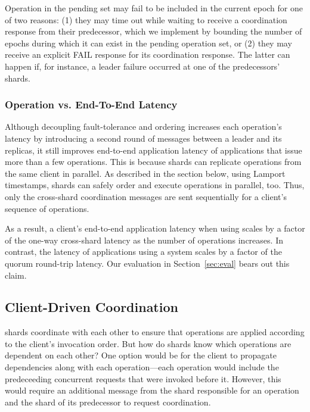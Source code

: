 Operation in the pending set may fail to be included in the current epoch for
one of two reasons: (1) they may time out while waiting to receive a
coordination response from their predecessor, which we implement by bounding the
number of epochs during which it can exist in the pending operation set, or (2)
they may receive an explicit FAIL response for its coordination response. The
latter can happen if, for instance, a leader failure occurred at one of the
predecessors' shards.


\subsubsection{Operation vs. End-To-End Latency}

Although decoupling fault-tolerance and ordering increases each operation's latency by introducing a
second round of messages between a leader and its replicas, it still improves end-to-end application
latency of applications that issue more than a few operations. This is because shards can replicate
operations from the same client in parallel. As described in the section below, using Lamport timestamps,
shards can safely order and execute operations in parallel, too. Thus, only the cross-shard coordination
messages are sent sequentially for a client's sequence of operations.

As a result, a client's end-to-end application latency when using \sys{} scales by a factor
of the one-way cross-shard latency as the number of operations increases. In contrast,
the latency of applications using a \singledispatch{} system scales by a factor of the
quorum round-trip latency. Our evaluation in Section~\ref{sec:eval} bears out this claim.

\subsection{Client-Driven Coordination}

\sys{} shards coordinate with each other to ensure that operations are applied
according to the client's invocation order. But how do shards know which
operations are dependent on each other? One option would be for the client to
propagate dependencies along with each operation---each operation would include
the predeceeding concurrent requests that were invoked before it. However, this
would require an additional message from the shard responsible for an operation
and the shard of its predecessor to request coordination.

